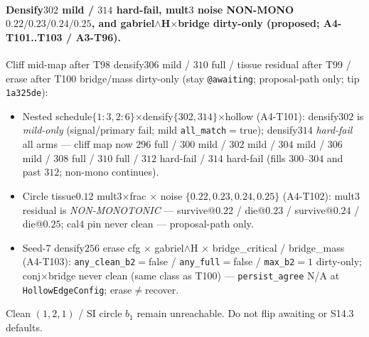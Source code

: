 \documentclass[11pt]{article}
\begin{document}
\paragraph{Densify$302$ mild / $314$ hard-fail, mult$3$ noise NON-MONO
$0.22/0.23/0.24/0.25$, and gabriel$\wedge$H$\times$bridge dirty-only
(proposed; A4-T101..T103 / A3-T96).}
Cliff mid-map after T98 densify$306$ mild / $310$ full / tissue residual
after T99 / erase after T100 bridge/mass dirty-only (stay
\texttt{@awaiting}; proposal-path only; tip \texttt{1a325de}):
\begin{itemize}[leftmargin=1.5em]
  \item Nested schedule$\{1{:}3,2{:}6\}$$\times$densify$\{302,314\}$$\times$hollow
  (A4-T101): densify$302$ is \emph{mild-only} (signal/primary fail; mild
  \texttt{all\_match}${=}$true); densify$314$ \emph{hard-fail} all arms ---
  cliff map now $296$ full / $300$ mild / $302$ mild / $304$ mild /
  $306$ mild / $308$ full / $310$ full / $312$ hard-fail / $314$
  hard-fail (fills $300$--$304$ and past $312$; non-mono continues).
  \item Circle tissue$0.12$ mult$3$$\times$frac $\times$ noise
  $\{0.22,0.23,0.24,0.25\}$ (A4-T102): mult$3$ residual is
  \emph{NON-MONOTONIC} --- survive@$0.22$ / die@$0.23$ / survive@$0.24$ /
  die@$0.25$; cal$4$ pin never clean --- proposal-path only.
  \item Seed-$7$ densify$256$ erase cfg $\times$ gabriel$\wedge$H $\times$
  bridge\_critical / bridge\_mass (A4-T103): \texttt{any\_clean\_b2}${=}$false /
  \texttt{any\_full}${=}$false / \texttt{max\_b2}${=}1$ dirty-only;
  conj$\times$bridge never clean (same class as T100) ---
  \texttt{persist\_agree} N/A at \texttt{HollowEdgeConfig}; erase$\neq$recover.
\end{itemize}
Clean $(1,2,1)$ / SI circle $b_1$ remain unreachable. Do not flip
awaiting or S14.3 defaults.
\end{document}
